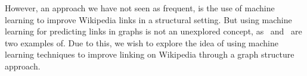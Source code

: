 However, an approach we have not seen as frequent, is the use of machine learning to improve Wikipedia links in a structural setting. But using machine learning for predicting links in graphs is not an unexplored concept, as~\cite{tang2015line} and~\cite{al2006link} are two examples of. Due to this, we wish to explore the idea of using machine learning techniques to improve linking on Wikipedia through a graph structure approach.


